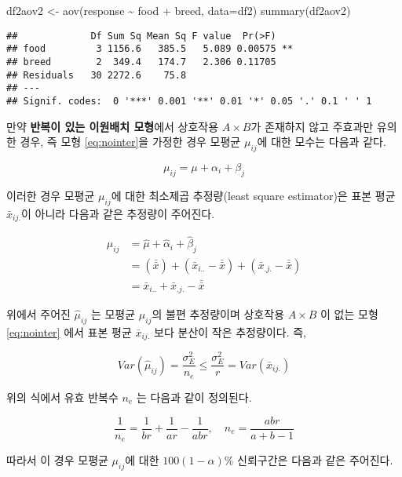 \documentclass[
]{book}
\newenvironment{Shaded}{\begin{snugshade}}{\end{snugshade}}
\newcommand{\AttributeTok}[1]{\textcolor[rgb]{0.77,0.63,0.00}{#1}}
\newcommand{\FunctionTok}[1]{\textcolor[rgb]{0.00,0.00,0.00}{#1}}
\newcommand{\NormalTok}[1]{#1}
\newcommand{\OtherTok}[1]{\textcolor[rgb]{0.56,0.35,0.01}{#1}}
\newcommand{\SpecialCharTok}[1]{\textcolor[rgb]{0.00,0.00,0.00}{#1}}
\begin{document}
\begin{Shaded}
\begin{Highlighting}[]
\NormalTok{df2aov2 }\OtherTok{\textless{}{-}} \FunctionTok{aov}\NormalTok{(response }\SpecialCharTok{\textasciitilde{}}\NormalTok{ food }\SpecialCharTok{+}\NormalTok{ breed, }\AttributeTok{data=}\NormalTok{df2)}
\FunctionTok{summary}\NormalTok{(df2aov2)}
\end{Highlighting}
\end{Shaded}

\begin{verbatim}
##             Df Sum Sq Mean Sq F value  Pr(>F)   
## food         3 1156.6   385.5   5.089 0.00575 **
## breed        2  349.4   174.7   2.306 0.11705   
## Residuals   30 2272.6    75.8                   
## ---
## Signif. codes:  0 '***' 0.001 '**' 0.01 '*' 0.05 '.' 0.1 ' ' 1
\end{verbatim}

만약 \textbf{반복이 있는 이원배치 모형}에서 상호작용 \(A \times B\)가 존재하지 않고 주효과만 유의한 경우, 즉 모형 \eqref{eq:nointer}을 가정한 경우 모평균 \(\mu_{ij}\)에 대한 모수는 다음과 같다.

\[ \mu_{ij} = \mu + \alpha_i + \beta_j \]

이러한 경우 모평균 \(\mu_{ij}\)에 대한 최소제곱 추정량(least square estimator)은 표본 평균 \(\bar x_{ij.}\)이 아니라 다음과 같은 추정량이 주어진다.

\begin{align*}
\hat \mu_{ij} & = \hat \mu + \hat \alpha_i + \hat \beta_j \\
  & = (\bar{\bar x}) + (\bar x_{i..}-\bar{\bar x}) + (\bar x_{.j.}-\bar{\bar x}) \\
  & = \bar x_{i..} + \bar x_{.j.} - \bar{\bar x} 
\end{align*}

위에서 주어진 \(\hat \mu_{ij}\) 는 모평균 \(\mu_{ij}\)의 불편 추정량이며 상호작용 \(A \times B\) 이 없는 모형 \eqref{eq:nointer} 에서 표본 평균 \(\bar x_{ij.}\) 보다 분산이 작은 추정량이다. 즉,

\[ Var \left (\hat \mu_{ij} \right ) = \frac{\sigma_E^2}{n_e}  \le \frac{\sigma_E^2}{r} = Var (\bar x_{ij.} )    \]

위의 식에서 유효 반복수 \(n_e\) 는 다음과 같이 정의된다.

\[ \frac{1}{n_e} = \frac{1}{br} + \frac{1}{ar} - \frac{1}{abr}, \quad n_e=\frac{abr}{a+b-1} \]

따라서 이 경우 모평균 \(\mu_{ij}\)에 대한 \(100(1-\alpha)\)\% 신뢰구간은 다음과 같은 주어진다.
\end{document}

